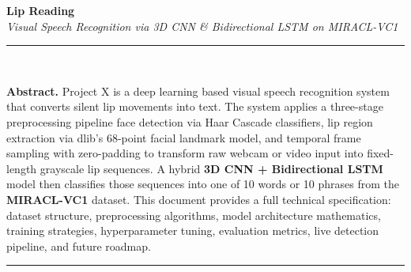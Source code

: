 \documentclass[10pt, a4paper]{article}
\begin{document}

\begin{center}
  {\Huge\bfseries\color{monodark} Lip Reading}\\[5pt]
  {\large\itshape\color{monomedium}
    Visual Speech Recognition via 3D CNN \& Bidirectional LSTM on MIRACL-VC1
  }\\[9pt]
  \noindent\rule{\linewidth}{0.4pt}\\[6pt]
\end{center}

\noindent\textbf{Abstract.}\quad
Project X is a deep learning based visual speech recognition system that
converts silent lip movements into text. The system applies a three-stage
preprocessing pipeline face detection via Haar Cascade classifiers, lip
region extraction via dlib's 68-point facial landmark model, and temporal
frame sampling with zero-padding to transform raw webcam or video input
into fixed-length grayscale lip sequences. A hybrid \textbf{3D CNN + Bidirectional
LSTM} model then classifies those sequences into one of 10 words or 10
phrases from the \textbf{MIRACL-VC1} dataset. This document provides a full
technical specification: dataset structure, preprocessing algorithms, model
architecture mathematics, training strategies, hyperparameter tuning,
evaluation metrics, live detection pipeline, and future roadmap.

\vspace{6pt}
\noindent\rule{\linewidth}{0.4pt}
\vspace{4pt}
\end{document}
